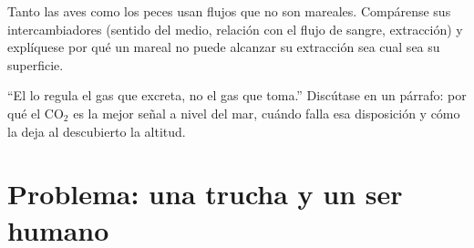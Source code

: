 \begin{exercise}[$\star\star\star$]\label{exo:b1:gas-exchange:11}
Tanto las aves como los peces usan flujos que no son mareales. Compárense
sus intercambiadores (sentido del medio, relación con el flujo de sangre,
extracción) y explíquese por qué un  mareal no puede alcanzar su
extracción sea cual sea su superficie.
\end{exercise}

\begin{exercise}[$\star\star\star$]\label{exo:b1:gas-exchange:12}
``El  lo regula el gas que excreta, no el gas que toma.'' Discútase en
un párrafo: por qué el $\mathrm{CO_2}$ es la mejor señal a nivel del mar,
cuándo falla esa disposición y cómo la deja al descubierto la altitud.
\end{exercise}

\section{Problema: una trucha y un ser humano}

